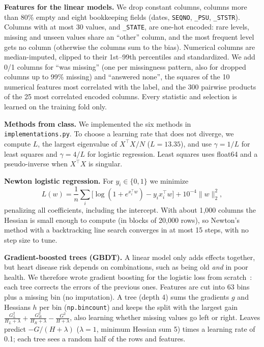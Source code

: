 \documentclass[10pt,conference,compsocconf]{IEEEtran}
\begin{document}
\textbf{Features for the linear models.} We drop constant columns, columns more than 80\% empty
and eight bookkeeping fields (dates, \texttt{SEQNO}, \texttt{\_PSU}, \texttt{\_STSTR}).
Columns with at most 30 values, and \texttt{\_STATE}, are one-hot encoded: rare levels, missing
and unseen values share an ``other'' column, and the most frequent level gets no column
(otherwise the columns sum to the bias). Numerical columns are median-imputed, clipped to their
1st--99th percentiles and standardized. We add 0/1 columns for ``was missing'' (one per missingness pattern, also for
dropped columns up to 99\% missing) and ``answered none'', the squares of the 10 numerical
features most correlated with the label, and the 300 pairwise products of the 25 most correlated
encoded columns. Every statistic and selection is learned on the training fold only.

\textbf{Methods from class.} We implemented the six methods in \texttt{implementations.py}. To
choose a learning rate that does not diverge, we compute $L$, the largest eigenvalue of
$X^\top X/N$ ($L = 13.35$), and use $\gamma = 1/L$ for least squares and $\gamma = 4/L$ for
logistic regression. Least squares uses float64 and a pseudo-inverse when $X^\top X$ is singular.

\textbf{Newton logistic regression.} For $y_i \in \{0,1\}$ we minimize
\begin{equation}
L(w) = \frac{1}{n}\sum_i \bigl[\log(1+e^{x_i^\top w}) - y_i x_i^\top w\bigr] + 10^{-4}\|w\|_2^2,
\end{equation}
penalizing all coefficients, including the intercept. With about 1{,}000 columns the Hessian is
small enough to compute (in blocks of 20{,}000 rows), so Newton's method with a backtracking line
search converges in at most 15 steps, with no step size to tune.

\textbf{Gradient-boosted trees (GBDT).} A linear model only adds effects together, but heart
disease risk depends on combinations, such as being old \emph{and} in poor health. We therefore
wrote gradient boosting for the logistic loss from scratch~\cite{friedman01,chen16xgboost,ke17lightgbm}:
each tree corrects the errors of the previous ones. Features are cut into 63 bins plus a missing
bin (no imputation). A tree (depth 4) sums the gradients $g$ and Hessians $h$ per bin
(\texttt{np.bincount}) and keeps the split with the largest gain
$\frac{G_L^2}{H_L+\lambda} + \frac{G_R^2}{H_R+\lambda} - \frac{G^2}{H+\lambda}$, also learning
whether missing values go left or right. Leaves predict $-G/(H+\lambda)$ ($\lambda = 1$, minimum
Hessian sum 5) times a learning rate of 0.1; each tree sees a random half of the rows and
features.
\end{document}
